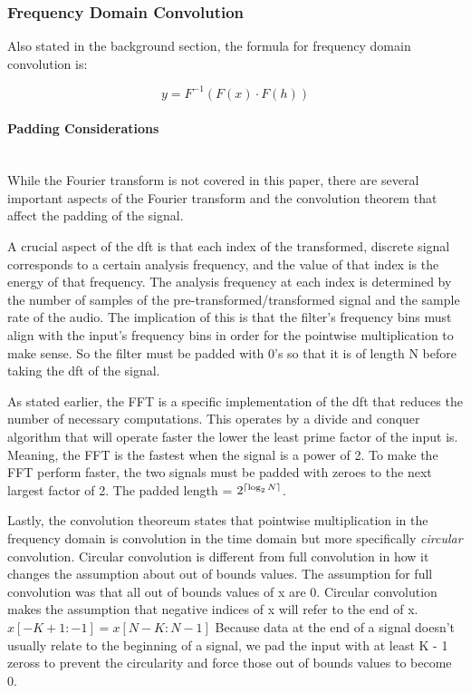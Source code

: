 \subsubsection{Frequency Domain Convolution}

Also stated in the background section, the formula for frequency domain convolution is:

$$y = F^{-1}(F(x) \cdot F(h))$$
\paragraph{Padding Considerations} \hspace{0pt} \\
\indent While the Fourier transform is not covered in this paper, there are several important aspects of the Fourier transform and the convolution theorem that affect the padding of the signal.

A crucial aspect of the \gls{dft} is that each index of the transformed, discrete signal corresponds to a certain analysis frequency, and the value of that index is the energy of that frequency. The analysis frequency at each index is determined by the number of samples of the pre-transformed/transformed signal and the sample rate of the audio. The implication of this is that the filter's frequency bins must align with the input's frequency bins in order for the pointwise multiplication to make sense. So the filter must be padded with 0's so that it is of length N before taking the \gls{dft} of the signal. 

As stated earlier, the FFT is a specific implementation of the \gls{dft} that reduces the number of necessary computations. This operates by a divide and conquer algorithm that will operate faster the lower the least prime factor of the input is. Meaning, the FFT is the fastest when the signal is a power of 2. To make the FFT perform faster, the two signals must be padded with zeroes to the next largest factor of 2. The padded length = $2^{\lceil\log_2N\rceil}$.

Lastly, the convolution theoreum states that pointwise multiplication in the frequency domain is convolution in the time domain but more specifically \textit{circular} convolution. Circular convolution is different from full convolution in how it changes the assumption about out of bounds values. The assumption for full convolution was that all out of bounds values of x are 0. Circular convolution makes the assumption that negative indices of x will refer to the end of x. $x[-K + 1:-1] = x[N - K: N - 1]$ Because data at the end of a signal doesn't usually relate to the beginning of a signal, we pad the input with at least K - 1 zeross to prevent the circularity and force those out of bounds values to become 0. 

